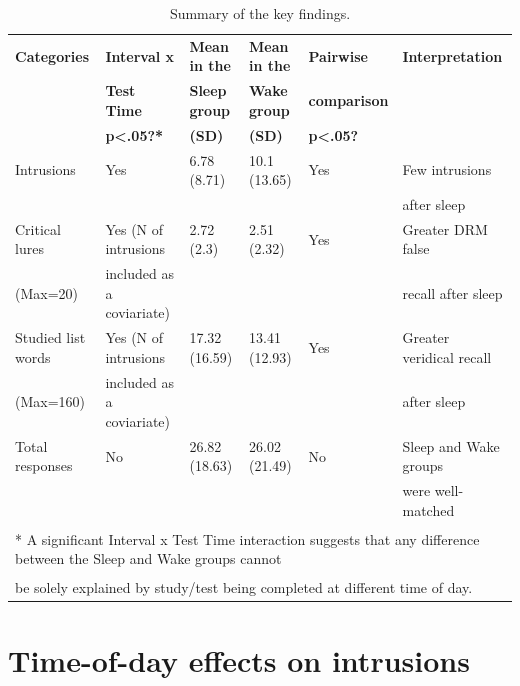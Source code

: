 \documentclass[
]{article}
\begin{document}
\begin{table}[H]

\caption{\label{tab:table9}Summary of the key findings.}
\centering
\fontsize{8}{10}\selectfont
\begin{tabular}[t]{llllll}
\toprule
\textbf{Categories} & \textbf{Interval x} & \textbf{Mean in the} & \textbf{Mean in the} & \textbf{Pairwise} & \textbf{Interpretation}\\
\textbf{} & \textbf{Test Time} & \textbf{Sleep group} & \textbf{Wake group} & \textbf{comparison} & \textbf{}\\
\textbf{} & \textbf{p<.05?*} & \textbf{(SD)} & \textbf{(SD)} & \textbf{p<.05?} & \textbf{}\\
\midrule
Intrusions & Yes & 6.78 (8.71) & 10.1 (13.65) & Yes & Few intrusions\\
 &  &  &  &  & after sleep\\
\midrule
\addlinespace
Critical lures & Yes (N of intrusions & 2.72 (2.3) & 2.51 (2.32) & Yes & Greater DRM false\\
(Max=20) & included as a coviariate) &  &  &  & recall after sleep\\
\midrule
Studied list words & Yes (N of intrusions & 17.32 (16.59) & 13.41 (12.93) & Yes & Greater veridical recall\\
(Max=160) & included as a coviariate) &  &  &  & after sleep\\
\midrule
Total responses & No & 26.82 (18.63) & 26.02 (21.49) & No & Sleep and Wake groups\\
\addlinespace
 &  &  &  &  & were well-matched\\
\bottomrule
\multicolumn{6}{l}{\textsuperscript{} * A significant Interval x Test Time interaction suggests that any difference between the Sleep and Wake groups cannot}\\
\multicolumn{6}{l}{\textsuperscript{} be solely explained by study/test being completed at different time of day.}\\
\end{tabular}
\end{table}

\hypertarget{time-of-day-effects-on-intrusions}{%
\section{Time-of-day effects on intrusions}\label{time-of-day-effects-on-intrusions}}
\end{document}
